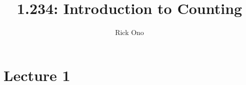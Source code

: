\documentclass[11pt,a4paper]{article}
\title{1.234: Introduction to Counting}
\author{Rick Ono}
\begin{document}
\maketitle

\section{Lecture 1}
\end{document}

